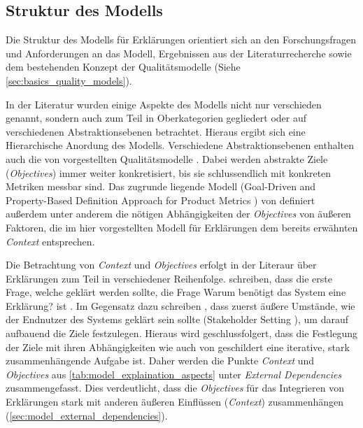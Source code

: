 \subsection{Struktur des Modells}

Die Struktur des Modells für Erklärungen orientiert sich an den Forschungsfragen und Anforderungen an das Modell, Ergebnissen aus der Literaturrecherche sowie dem bestehenden Konzept der Qualitätsmodelle \cite{schneider2012abenteuer} (Siehe \autoref{sec:basics_quality_models}).

In der Literatur wurden einige Aspekte des Modells nicht nur verschieden genannt, sondern auch zum Teil in Oberkategorien gegliedert oder auf verschiedenen Abstraktionsebenen betrachtet. Hieraus ergibt sich eine Hierarchische Anordung des Modells. Verschiedene Abstraktionsebenen enthalten auch die von \citeauthor{schneider2012abenteuer} vorgestellten Qualitätsmodelle \cite{schneider2012abenteuer}. Dabei werden abstrakte Ziele (\textit{Objectives}) immer weiter konkretisiert, bis sie schlussendlich mit konkreten Metriken messbar sind. Das zugrunde liegende Modell (\glqq Goal-Driven and Property-Based Definition Approach for Product Metrics\grqq{} \cite{briand1995goal}) von \citeauthor{briand1995goal} definiert außerdem unter anderem die nötigen Abhängigkeiten der \textit{Objectives} von äußeren Faktoren, die im hier vorgestellten Modell für Erklärungen dem bereits erwähnten \textit{Context} entsprechen.

Die Betrachtung von \textit{Context} und \textit{Objectives} erfolgt in der Literaur über Erklärungen zum Teil in verschiedener Reihenfolge. \citeauthor{rosenfeld_explainability_2019} schreiben, dass die erste Frage, welche geklärt werden sollte, die Frage \glqq Warum benötigt das System eine Erklärung?\grqq{} ist \cite[vgl. S. 699][]{rosenfeld_explainability_2019}\cite{nunes_systematic_2017}. Im Gegensatz dazu schreiben \citeauthor{cirqueira_scenario-based_2020}, dass zuerst äußere Umstände, wie der Endnutzer des Systems geklärt sein sollte (\glqq Stakeholder Setting\grqq{} \cite{cirqueira_scenario-based_2020}), um darauf aufbauend die Ziele festzulegen. Hieraus wird geschlussfolgert, dass die Festlegung der Ziele mit ihren Abhängigkeiten wie auch von \cite{schneider2012abenteuer} geschildert eine iterative, stark zusammenhängende Aufgabe ist. Daher werden die Punkte \textit{Context} und \textit{Objectives} aus \autoref{tab:model_explaination_aspects} unter \textit{External Dependencies} zusammengefasst. Dies verdeutlicht, dass die \textit{Objectives} für das Integrieren von Erklärungen stark mit anderen äußeren Einflüssen (\textit{Context}) zusammenhängen (\autoref{sec:model_external_dependencies}).

